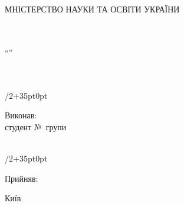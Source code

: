 
\newcommand{\rightshift}{35pt}

\thispagestyle{empty}

{ \sffamily
\begin{center}
	\LARGE{МНІСТЕРСТВО НАУКИ ТА ОСВІТИ УКРАЇНИ}\\
	\LARGE{\university}\\
	\Large{\faculty}\\
	\Large{\department}
\end{center}

\vspace*{\fill}

\begin{center}
	\Large
	``\subjectname''\\
	\prodname\ \prodnumber\\
	\proddate\\
\end{center}
\vspace*{\fill}
\begin{adjustwidth}{\textwidth/2+\rightshift}{0pt}
	\begin{flushleft}
		\large
		Виконав:\\
		студент №\studentnumber\ групи \shortdepartment\ \groupnumber\ \shortuniversity\\
		\studentname\\
	\end{flushleft}
\end{adjustwidth}

\vspace{1cm}

\begin{adjustwidth}{\textwidth/2+\rightshift}{0pt}
	\begin{flushleft}
		\large
		Прийняв:\\
		\teacher{}
	\end{flushleft}
\end{adjustwidth}
}

\vspace*{\fill}

\begin{center}
	Київ \the\year{}
\end{center}

\newpage